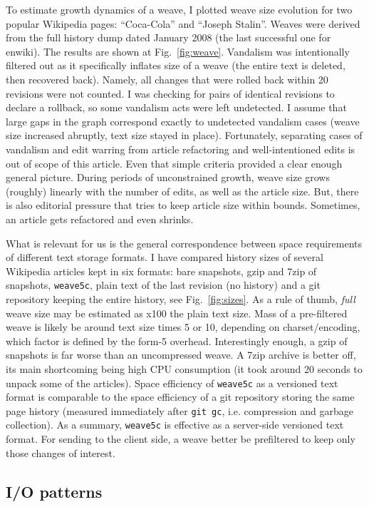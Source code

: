 \documentclass{sig-alternate}
\begin{document}
To estimate growth dynamics of a weave, I plotted weave size evolution for two popular Wikipedia pages: ``Coca-Cola'' and ``Joseph Stalin''.
Weaves were derived from the full history dump dated January 2008 (the last successful one for enwiki).
The results are shown at Fig.~\ref{fig:weave}.
Vandalism was intentionally filtered out as it specifically inflates size of a weave (the entire text is deleted, then recovered back).
Namely, all changes that were rolled back within 20 revisions were  not counted.
I was checking for pairs of identical revisions to declare a rollback, so some vandalism acts were left undetected.
I assume that large gaps in the graph correspond exactly to undetected vandalism cases (weave size increased abruptly, text size stayed in place).
Fortunately, separating cases of vandalism and edit warring from article refactoring and well-intentioned edits is out of scope of this article.
Even that simple criteria provided a clear enough general picture.
During periods of unconstrained growth, weave size grows (roughly) linearly with the number of edits, as well as the article size.
But, there is also editorial pressure that tries to keep article size within bounds. Sometimes, an article gets refactored and even shrinks.

What is relevant for us is the general correspondence between space requirements of different text storage formats.
I have compared history sizes of several Wikipedia articles kept in six formats: bare snapshots, gzip and 7zip of snapshots, {\tt weave5c}, plain text of the last revision (no history) and a git repository keeping the entire history, see Fig.~\ref{fig:sizes}.
As a rule of thumb, \emph{full} weave size may be estimated as x100 the plain text size.
Mass of a pre-filtered weave is likely be around text size times 5 or 10, depending on charset/encoding, which factor is defined by the form-5 overhead.
Interestingly enough, a gzip of snapshots is far worse than an uncompressed weave.
A 7zip archive is better off, its main shortcoming being high CPU consumption (it took around 20 seconds to unpack some of the articles).
Space efficiency of {\tt weave5c} as a versioned text format is comparable to the space efficiency of a git repository storing the same page history (measured immediately after \verb+git gc+, i.e. compression and garbage collection).
As a summary, {\tt weave5c} is effective as a server-side versioned text format. 
For sending to the client side, a weave better be prefiltered to keep only those changes of interest.

\subsection{I/O patterns}	\label{sec:io}
\end{document}
